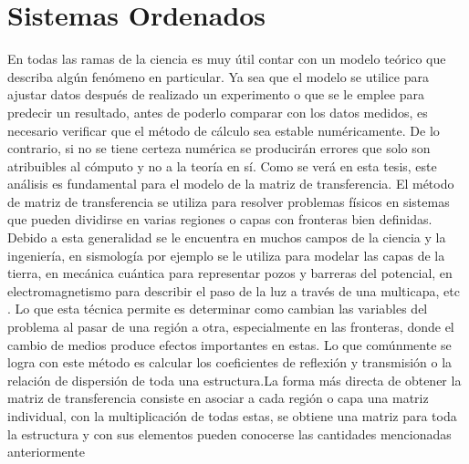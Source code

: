 \documentclass[a4paper,11pt,]{book}
\begin{document}
\section{Sistemas Ordenados}
En todas las ramas de la ciencia es muy útil contar con un modelo teórico que describa algún fenómeno en particular. Ya sea que el modelo se utilice para ajustar datos después de realizado un experimento o que se le emplee para predecir un resultado, antes de poderlo comparar con los datos medidos, es necesario verificar que el método de cálculo sea estable numéricamente. De lo contrario, si no se tiene certeza numérica se producirán errores que solo son atribuibles al cómputo y no a la teoría en sí. Como se verá en esta tesis, este análisis es fundamental para el modelo de la matriz de transferencia\cite{1}. El método de matriz de transferencia se utiliza para resolver problemas físicos en sistemas que pueden dividirse en varias regiones o capas con fronteras bien definidas. Debido a esta generalidad se le encuentra en muchos campos de la ciencia y la ingeniería, en sismología por ejemplo se le utiliza para modelar las capas de la tierra, en mecánica cuántica para representar pozos y barreras del potencial, en electromagnetismo para describir el paso de la luz a través de una multicapa, etc \cite{2,3,4,5}. Lo que esta técnica permite es determinar como cambian las variables del problema al pasar de una región a otra, especialmente en las fronteras, donde el cambio de medios produce efectos importantes en estas. Lo que comúnmente se logra con este método es calcular los coeficientes de reflexión y transmisión o la relación de dispersión de toda una estructura.La forma más directa de obtener la matriz de transferencia consiste en asociar a cada región o capa una matriz individual, con la multiplicación de todas estas, se obtiene una matriz para toda la estructura y con sus elementos pueden conocerse las cantidades mencionadas anteriormente\cite{6,7,8,9,10,11}
\end{document}
